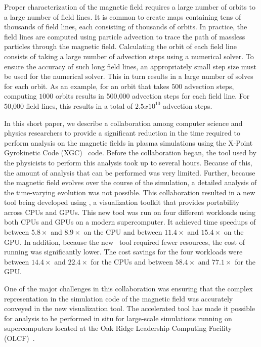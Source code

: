 Proper characterization of the magnetic field requires a large number of orbits to a large number of field lines. It is common to create \poincare maps containing tens of thousands of field lines, each consisting of thousands of orbits.
In practice, the field lines are computed using particle advection to trace the path of massless particles through the magnetic field. Calculating the orbit of each field line consists of taking a large number of advection steps using a numerical solver. To ensure the accuracy of such long field lines, an appropriately small step size must be used for the numerical solver. This in turn results in a large number of solves for each orbit. As an example, for an orbit that takes $500$ advection steps, computing $1000$ orbits results in 500,000 advection steps for each field line. For 50,000 field lines, this results in a total of $2.5 x 10^{10}$ advection steps.

In this short paper, we describe a collaboration among computer science and physics researchers to provide a significant reduction in the time required to perform \poincare analysis on the magnetic fields in plasma simulations using the X-Point Gyrokinetic Code (XGC)~\cite{HAGER2016644} code.  Before the collaboration began, the tool used by the physicists to perform this analysis took up to several hours. Because of this, the amount of analysis that can be performed was very limited. Further, because the magnetic field evolves over the course of the simulation, a detailed analysis of the time-varying evolution was not possible.
This collaboration resulted in a new \poincare tool being developed using \vtkm \cite{moreland2016vtk}, a visualization toolkit that provides portability across CPUs and GPUs.
This new tool was run on four different workloads using both CPUs and GPUs on a modern supercomputer. It achieved time speedups of between $5.8\times$ and $8.9\times$ on the CPU and between $11.4\times$ and $15.4\times$ on the GPU. In addition, because the new \poincare\ tool required fewer resources, the cost of running was significantly lower. The cost savings for the four workloads were between $14.4\times$ and $22.4\times$ for the CPUs and between $58.4\times$ and $77.1\times$ for the GPU.

One of the major challenges in this collaboration was ensuring that the complex representation in the simulation code of the magnetic field was accurately conveyed in the new visualization tool.
The \vtkm accelerated tool has made it possible for \poincare analysis to be performed in situ for large-scale simulations running on supercomputers located at the Oak Ridge Leadership Computing Facility (OLCF)~\cite{Suchyta2022}.

